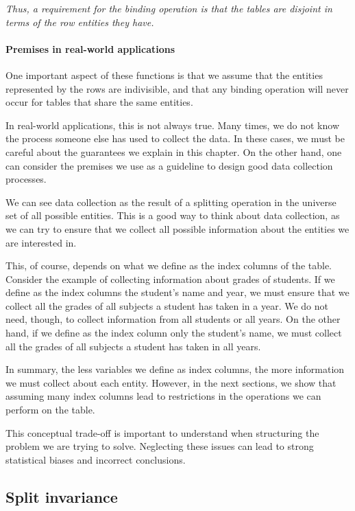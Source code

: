 \emph{Thus, a requirement for the binding operation is that the tables are disjoint in
terms of the row entities they have.}

\paragraph{Premises in real-world applications}

One important aspect of these functions is that we assume that the entities represented by
the rows are indivisible, and that any binding operation will never occur for tables that
share the same entities.

In real-world applications, this is not always true.  Many times, we do not know the
process someone else has used to collect the data.  In these cases, we must be careful
about the guarantees we explain in this chapter.  On the other hand, one can consider the
premises we use as a guideline to design good data collection processes.

We can see data collection as the result of a splitting operation in the universe set of
all possible entities.  This is a good way to think about data collection, as we can try
to ensure that we collect all possible information about the entities we are interested
in.

This, of course, depends on what we define as the index columns of the table.  Consider
the example of collecting information about grades of students.  If we define as the index
columns the student's name and year, we must ensure that we collect all the grades of all
subjects a student has taken in a year.  We do not need, though, to collect information
from all students or all years.  On the other hand, if we define as the index column only
the student's name, we must collect all the grades of all subjects a student has taken in
all years.

In summary, the less variables we define as index columns, the more information we must
collect about each entity.  However, in the next sections, we show that assuming many index columns
lead to restrictions in the operations we can perform on the table.

This conceptual trade-off is important to understand when structuring the problem we are
trying to solve.  Neglecting these issues can lead to strong statistical biases and
incorrect conclusions.

\subsection{Split invariance}


